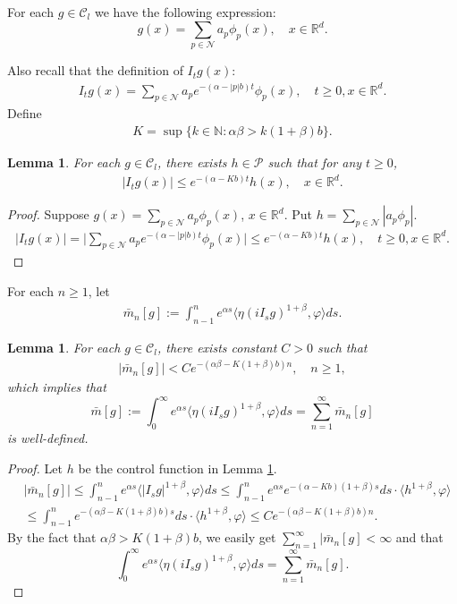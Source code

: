 \documentclass[12pt,a4paper]{amsart}
\theoremstyle{plain}
\newtheorem{lem}[thm]{Lemma}
\theoremstyle{definition}
\numberwithin{equation}{section}
\begin{document}
For each $g\in \mathcal{C}_l$ we have the following expression:
    $$g(x)=\sum_{p\in \mathcal{N}}a_p\phi_p(x), \quad x\in\mathbb{R}^d.$$

Also recall that the definition of $I_tg(x)$:
\begin{align}
    I_tg(x)=\sum_{p\in \mathcal{N}}a_pe^{-(\alpha-|p|b)t}\phi_p(x), \quad t\geq 0, x\in \mathbb{R}^d.
\end{align}
Define
\begin{align}
    K=\sup\{k\in \mathbb{N}: \alpha\beta>k(1+\beta)b\}.
\end{align}

\begin{lem}\label{lem: control of Isg}
 For each $g\in \mathcal{C}_l$, there exists $h\in \mathcal{P}$ such that  for any $t\geq 0$,
\begin{align}
    |I_tg(x)|\leq e^{-(\alpha-Kb)t}h(x),\quad x\in \mathbb{R}^d.
\end{align}
\end{lem}
\begin{proof}
Suppose $g(x)=\sum_{p\in \mathcal{N}}a_p\phi_p(x)$, $x\in\mathbb{R}^d$.  Put  $h=\sum_{p\in \mathcal{N}}|a_p\phi_p|$.
\begin{align}
    |I_tg(x)|=\Big|\sum_{p\in\mathcal{N}}a_pe^{-(\alpha-|p|b)t}\phi_p(x)\Big|\leq e^{-(\alpha-Kb)t}h(x),\quad t\geq 0,x\in \mathbb{R}^d.
\end{align}
\end{proof}
For each  $n\geq 1$, let
\begin{align}
    \bar{m}_n[g]:=\int_{n-1}^n e^{\alpha s}\langle \eta(iI_sg)^{1+\beta},\varphi\rangle ds.
\end{align}
\begin{lem}\label{lem: control of mn}
For each $g\in \mathcal{C}_l$,  there exists constant $C>0$ such that
 \begin{align}
     |\bar{m}_n[g]|< C e^{-(\alpha\beta-K(1+\beta)b)n}, \quad n\geq 1,
 \end{align}
which implies that
\begin{equation}\label{sum-bar-m}\bar{m}[g]:=\int_{0}^\infty e^{\alpha s}\langle \eta(iI_sg)^{1+\beta},\varphi\rangle ds=\sum_{n=1}^{\infty}\bar{m}_n[g]\end{equation}
is well-defined.
\end{lem}
\begin{proof}
Let $h$ be the control function in Lemma \ref{lem: control of Isg}.
\begin{align}
    &|\bar{m}_n[g]|\leq \int_{n-1}^n e^{\alpha s}\langle |I_sg|^{1+\beta}, \varphi\rangle ds\leq \int_{n-1}^n e^{\alpha s}e^{-(\alpha-Kb)(1+\beta)s}ds\cdot \langle h^{1+\beta}, \varphi\rangle\\
    &\leq \int_{n-1}^n e^{-(\alpha\beta-K(1+\beta)b)s}ds\cdot\langle h^{1+\beta}, \varphi\rangle
    \leq C e^{-(\alpha\beta-K(1+\beta)b)n}.
\end{align}
By the fact that $\alpha\beta>K(1+\beta)b$, we easily get
$\sum_{n=1}^{\infty}|\bar{m}_n[g]<\infty$ and that  $$\int_{0}^\infty e^{\alpha s}\langle \eta(iI_sg)^{1+\beta},\varphi\rangle ds=\sum_{n=1}^{\infty}\bar{m}_n[g].$$
\end{proof}
\end{document}
